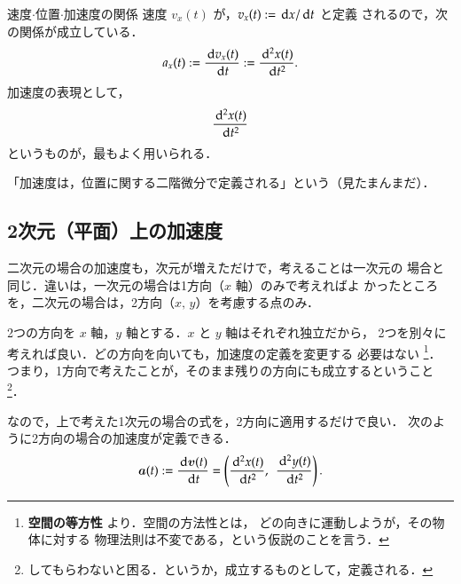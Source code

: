             \begin{memo}{速度$\cdot$位置$\cdot$加速度の関係}
                速度 $v_{x}(t)$ が，$v_{x}(t) := \,\mathrm{d} x/ \,\mathrm{d} t$ と定義
                されるので，次の関係が成立している．
                \begin{align}
                    a_{x}(t) := \frac{\,\mathrm{d} v_{x}(t)}{\,\mathrm{d} t} := \frac{\,\mathrm{d}^{2} x(t)}{\,\mathrm{d} t^{2}}.
                \end{align}
                加速度の表現として，
                    \begin{equation*}
                        \frac{\,\mathrm{d}^{2} x(t)}{\,\mathrm{d} t^{2}}
                    \end{equation*}
                というものが，最もよく用いられる．

                「加速度は，位置に関する二階微分で定義される」という（見たまんまだ）．
            \end{memo}

        \subsection{2次元（平面）上の加速度}
            二次元の場合の加速度も，次元が増えただけで，考えることは一次元の
            場合と同じ．違いは，一次元の場合は1方向（$x$ 軸）のみで考えればよ
            かったところを，二次元の場合は，2方向（$x,\,y$）を考慮する点のみ．

            2つの方向を $x$ 軸，$y$ 軸とする．$x$ と $y$ 軸はそれぞれ独立だから，
            2つを別々に考えれば良い．どの方向を向いても，加速度の定義を変更する
            必要はない
                \footnote{
                    \textbf{空間の等方性} より．空間の方法性とは，
                    どの向きに運動しようが，その物体に対する
                    物理法則は不変である，という仮説のことを言う．
                }．
            つまり，1方向で考えたことが，そのまま残りの方向にも成立するということ
                \footnote{
                    してもらわないと困る．というか，成立するものとして，定義される．
                }．

            なので，上で考えた1次元の場合の式を，2方向に適用するだけで良い．
            次のように2方向の場合の加速度が定義できる．
                \begin{align}
                    \boldsymbol{a} (t) := \frac{\,\mathrm{d} \boldsymbol{v}(t)}{\,\mathrm{d} t}
                             = \left(
                                   \frac{\,\mathrm{d}^{2} x(t)}{\,\mathrm{d} t^{2}},\,\;
                                   \frac{\,\mathrm{d}^{2} y(t)}{\,\mathrm{d} t^{2}}
                               \right).
                \end{align}

